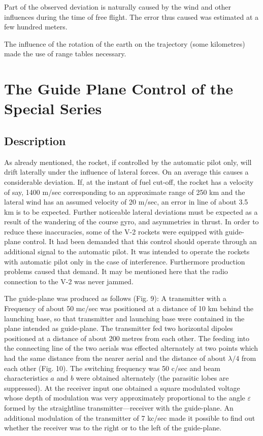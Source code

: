 \documentclass[12pt, a4paper]{article}
\begin{document}
Part of the observed deviation is naturally caused by the wind and other influences during the time of free flight. The error thus caused was estimated at a few hundred meters.

The influence of the rotation of the earth on the trajectory (some kilometres) made the use of range tables necessary.

\section{The Guide Plane Control of the Special Series}

\subsection{Description}

As already mentioned, the rocket, if controlled by the automatic pilot only, will drift laterally under the influence of lateral forces. On an average this causes a considerable deviation. If, at the instant of fuel cut-off, the rocket has a velocity of say, 1400 m/sec corresponding to an approximate range of 250 km and the lateral wind has an assumed velocity of 20 m/sec, an error in line of about 3.5 km is to be expected. Further noticeable lateral deviations must be expected as a result of the wandering of the course gyro, and asymmetries in thrust. In order to reduce these inaccuracies, some of the V-2 rockets were equipped with guide-plane control. It had been demanded that this control should operate through an additional signal to the automatic pilot. It was intended to operate the rockets with automatic pilot only in the case of interference. Furthermore production problems caused that demand. It may be mentioned here that the radio connection to the V-2 was never jammed.

The guide-plane was produced as follows (Fig. 9): A transmitter with a Frequency of about 50 mc/sec was positioned at a distance of 10 km behind the launching base, so that transmitter and launching base were contained in the plane intended as guide-plane. The transmitter fed two horizontal dipoles positioned at a distance of about 200 metres from each other. The feeding into the connecting line of the two aerials was effected alternately at two points which had the same distance from the nearer aerial and the distance of about $\lambda/4$ from each other (Fig. 10). The switching frequency was 50 c/sec and beam characteristics $a$ and $b$ were obtained alternately (the parasitic lobes are suppressed). At the receiver input one obtained a square modulated voltage whose depth of modulation was very approximately proportional to the angle $\varepsilon$ formed by the straightline transmitter—receiver with the guide-plane. An additional modulation of the transmitter of 7 kc/sec made it possible to find out whether the receiver was to the right or to the left of the guide-plane.
\end{document}
